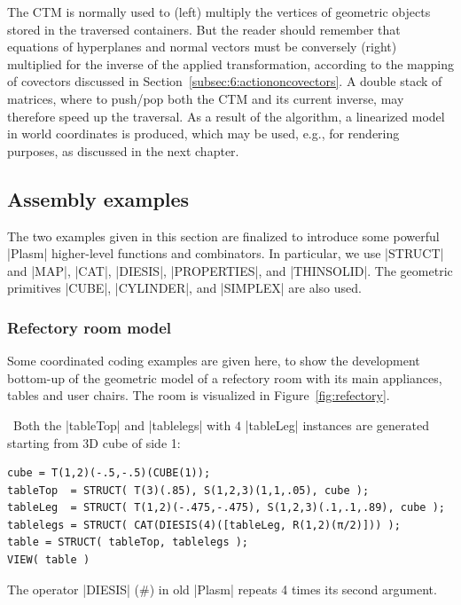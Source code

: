 \begin{coding}
\vspace{5mm}
The CTM is normally used to (left) multiply the vertices of geometric
objects stored in the traversed containers.  But the reader should
remember that equations of hyperplanes and normal vectors must be
conversely (right) multiplied for the inverse of the applied
transformation, according to the mapping of covectors discussed in
Section~\ref{subsec:6:actiononcovectors}.  A double stack of matrices,
where to push/pop both the CTM and its current inverse, may therefore
speed up the traversal.  As a result of the algorithm, a linearized model
in world coordinates is produced, which may be used, e.g., for rendering
purposes, as discussed in the next chapter.



\subsection*{Assembly examples}\label{sect:4-3-4}

The two examples given in this section are finalized to introduce some powerful |Plasm| higher-level functions and combinators. In particular, we use |STRUCT| and |MAP|, |CAT|, |DIESIS|, |PROPERTIES|, and |THINSOLID|. The geometric primitives |CUBE|, |CYLINDER|, and |SIMPLEX| are also used.

\subsubsection*{Refectory room model}\label{sect:4-3-4-1}

Some coordinated coding examples are given here, to show the development bottom-up of the geometric model of a refectory room with its main appliances, tables and user chairs. The room is visualized in Figure~\ref{fig:refectory}.

\begin{coding}[Table]\ 
Both the |tableTop| and |tablelegs| with $4$ |tableLeg| instances are generated starting from 3D cube of side 1:
\begin{lstlisting}[language=JuliaLocal, style=julia, mathescape=true]
cube = T(1,2)(-.5,-.5)(CUBE(1));
tableTop  = STRUCT( T(3)(.85), S(1,2,3)(1,1,.05), cube );
tableLeg  = STRUCT( T(1,2)(-.475,-.475), S(1,2,3)(.1,.1,.89), cube );
tablelegs = STRUCT( CAT(DIESIS(4)([tableLeg, R(1,2)(π/2)])) );
table = STRUCT( tableTop, tablelegs );
VIEW( table )
\end{lstlisting}
The operator |DIESIS| ($\#$) in old |Plasm| repeats 4 times its second argument.
\end{coding}


\end{coding}
